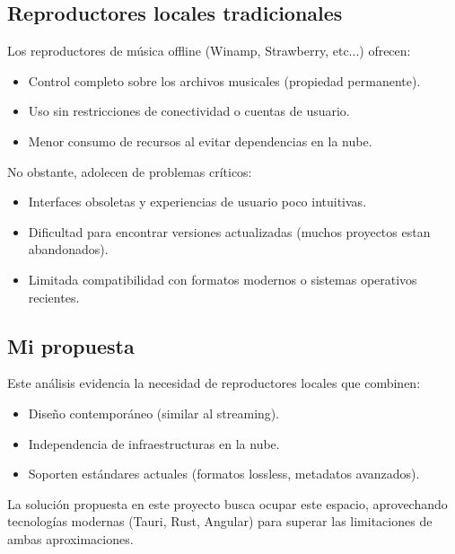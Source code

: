 \documentclass[11pt, a4paper]{article}
\begin{document}
        \subsection{Reproductores locales tradicionales}

        Los reproductores de música offline (Winamp, Strawberry, etc...) ofrecen:

        \begin{itemize}
            \item Control completo sobre los archivos musicales (propiedad permanente).
            \item Uso sin restricciones de conectividad o cuentas de usuario.
            \item Menor consumo de recursos al evitar dependencias en la nube.
        \end{itemize}

        No obstante, adolecen de problemas críticos:

        \begin{itemize}
            \item Interfaces obsoletas y experiencias de usuario poco intuitivas.
            \item Dificultad para encontrar versiones actualizadas (muchos proyectos estan abandonados).
            \item Limitada compatibilidad con formatos modernos o sistemas operativos recientes.
        \end{itemize}

        \subsection{Mi propuesta}

        Este análisis evidencia la necesidad de reproductores locales que combinen:

        \begin{itemize}
            \item Diseño contemporáneo (similar al streaming).
            \item Independencia de infraestructuras en la nube.
            \item Soporten estándares actuales (formatos lossless, metadatos avanzados).
        \end{itemize}

        La solución propuesta en este proyecto busca ocupar este espacio, aprovechando tecnologías modernas (Tauri, Rust, Angular) para superar las limitaciones de ambas aproximaciones.
\end{document}
